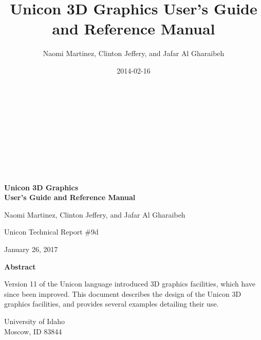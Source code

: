 \documentclass[letterpaper]{article}
\title{Unicon 3D Graphics User's Guide and Reference Manual}
\author{Naomi Martinez, Clinton Jeffery, and Jafar Al Gharaibeh}
\date{2014-02-16}
\begin{document}
\clearpage\setcounter{page}{1}\pagestyle{Nextconverti}
\thispagestyle{Standard}

\ \\
\ \\
\ \\
\ \\
\ \\
\ \\
\ \\

\begin{center}
{\Large\bfseries
Unicon 3D Graphics\\
User's Guide and Reference Manual
}
\end{center}

\bigskip

\bigskip

\bigskip

\bigskip

\bigskip

\bigskip

\bigskip


{\centering
Naomi Martinez, Clinton Jeffery, and Jafar Al Gharaibeh
\par}

{\centering
Unicon Technical Report \#9d
\par}

{\centering
January 26, 2017
\par}

\bigskip

\bigskip

\bigskip

\bigskip

\bigskip

{\centering\bfseries
Abstract
\par}


\bigskip

Version 11 of the Unicon language introduced 3D graphics facilities,
which have since been improved.  This document describes the design of
the Unicon 3D graphics facilities, and provides several examples
detailing their use.


\bigskip


\bigskip


\bigskip


\bigskip


\bigskip

{\centering
University of Idaho\\
Moscow, ID 83844
\par}
\end{document}
